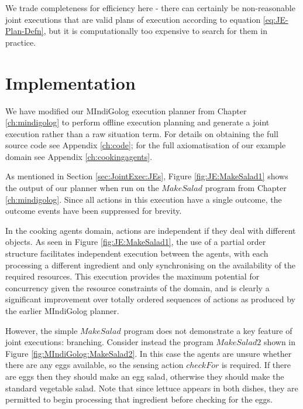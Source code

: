 We trade completeness for efficiency here - there can certainly be
non-reasonable joint executions that are valid plans of execution
according to equation \eqref{eq:JE-Plan-Defn}, but it is computationally
too expensive to search for them in practice.


\section{Implementation\label{sec:JointExec:Implementation}}

We have modified our MIndiGolog execution planner from Chapter \ref{ch:mindigolog}
to perform offline execution planning and generate a joint execution
rather than a raw situation term. For details on obtaining the full
source code see Appendix \eqref{ch:code}; for the full axiomatisation
of our example domain see Appendix \eqref{ch:cookingagents}.

As mentioned in Section \eqref{sec:JointExec:JEs}, Figure \ref{fig:JE:MakeSalad1}
shows the output of our planner when run on the $MakeSalad$ program
from Chapter \eqref{ch:mindigolog}. Since all actions in this execution
have a single outcome, the outcome events have been suppressed for
brevity.

In the cooking agents domain, actions are independent if they deal
with different objects. As seen in Figure \ref{fig:JE:MakeSalad1},
the use of a partial order structure facilitates independent execution
between the agents, with each processing a different ingredient and
only synchronising on the availability of the required resources.
This execution provides the maximum potential for concurrency given
the resource constraints of the domain, and is clearly a significant
improvement over totally ordered sequences of actions as produced
by the earlier MIndiGolog planner.

However, the simple $MakeSalad$ program does not demonstrate a key
feature of joint executions: branching. Consider instead the program
$MakeSalad2$ shown in Figure \ref{fig:MIndiGolog:MakeSalad2}. In
this case the agents are unsure whether there are any eggs available,
so the sensing action $checkFor$ is required. If there are eggs then
they should make an egg salad, otherwise they should make the standard
vegetable salad. Note that since lettuce appears in both dishes, they
are permitted to begin processing that ingredient before checking
for the eggs.

